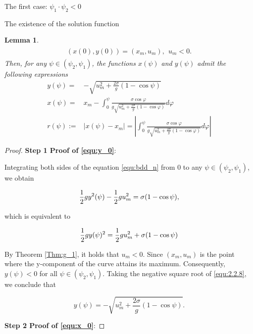 \documentclass[letterpaper,reqno,10pt,twoside]{amsart}
\newtheorem{lemma}[theorem]{Lemma}
\theoremstyle{definition}
\theoremstyle{remark}
\begin{document}
\begin{section}{The first case: $\psi_1\cdot \psi_2<0$ }
\begin{subsection}{The existence of the solution function}
\begin{lemma}{\label{lem:curve}}
        \begin{align}
            \begin{aligned}
                (x(0),y(0))=(x_{m},u_{m}),~~u_{m}<0.
            \end{aligned}
        \end{align}
          Then, for any $\psi\in(\psi_{2},\psi_{1})$, the functions $x(\psi)$ and $y(\psi)$ admit the following expressions
        \begin{align}
            y(\psi)=&-\sqrt{u_{m}^{2}+\frac{2\sigma}{g}(1-\cos\psi)}\label{equ:y_0}\\
            x(\psi)=&x_{m}-\int_{0}^{\psi}\frac{\sigma\cos\varphi}{g\sqrt{u_{m}^{2}+\frac{2\sigma}{g}(1-\cos\varphi)}}d\varphi\label{equ:x_0}\\
            r(\psi):=&|x(\psi)-x_{m}|=|\int_{0}^{\psi}\frac{\sigma\cos\varphi}{g\sqrt{u_{m}^{2}+\frac{2\sigma}{g}(1-\cos\varphi)}}d\varphi| \label{equ:2.2.100}
        \end{align}
    \end{lemma}
    \begin{proof}
        \textbf{Step 1 Proof of \eqref{equ:y_0}}: 
        
        Integrating both sides of the equation \eqref{equ:bdd_n} from $0$ to any $\psi\in (\psi_{2},\psi_{1})$, we obtain
    
        \begin{equation}{\label{equ:2.2.7}}
           \frac{1}{2}gy^{2}(\psi)-\frac{1}{2}gu_m^{2}=\sigma(1-\cos\psi),
        \end{equation}

        \noindent which is equivalent to

        \begin{equation}{\label{equ:2.2.8}}
             \frac{1}{2}gy(\psi)^{2}=\frac{1}{2}gu_{m}^{2}+\sigma(1-\cos\psi)
        \end{equation}

         \noindent By Theorem \ref{Thm:g_1}, it holds that $u_{m}<0$. Since $(x_m,u_m)$ is the point where the y-component of the curve attains its maximum. Consequently, $y(\psi)<0$ for all $\psi\in(\psi_{2},\psi_{1})$. Taking the negative square root of \eqref{equ:2.2.8}, we conclude that
        
        \begin{equation*}
            y(\psi)=-\sqrt{u_m^{2}+\frac{2\sigma}{g}(1-\cos\psi)}.
        \end{equation*} 

\textbf{ Step 2 Proof of \eqref{equ:x_0}}:


\end{proof}
\end{subsection}
\end{section}
\end{document}
